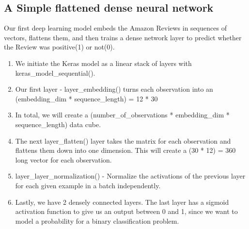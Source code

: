 \documentclass[
]{article}
\begin{document}
\hypertarget{a-simple-flattened-dense-neural-network}{%
\subsection{A Simple flattened dense neural
network}\label{a-simple-flattened-dense-neural-network}}

Our first deep learning model embeds the Amazon Reviews in sequences of
vectors, flattens them, and then trains a dense network layer to predict
whether the Review was positive(1) or not(0).

\begin{enumerate}
\def\labelenumi{\arabic{enumi}.}
\item
  We initiate the Keras model as a linear stack of layers with
  keras\_model\_sequential().
\item
  Our first layer - layer\_embedding() turns each observation into an
  (embedding\_dim * sequence\_length) = 12 * 30
\item
  In total, we will create a (number\_of\_observations * embedding\_dim
  * sequence\_length) data cube.
\item
  The next layer\_flatten() layer takes the matrix for each observation
  and flattens them down into one dimension. This will create a (30 *
  12) = 360 long vector for each observation.
\item
  layer\_layer\_normalization() - Normalize the activations of the
  previous layer for each given example in a batch independently.
\item
  Lastly, we have 2 densely connected layers. The last layer has a
  sigmoid activation function to give us an output between 0 and 1,
  since we want to model a probability for a binary classification
  problem.
\end{enumerate}
\end{document}
